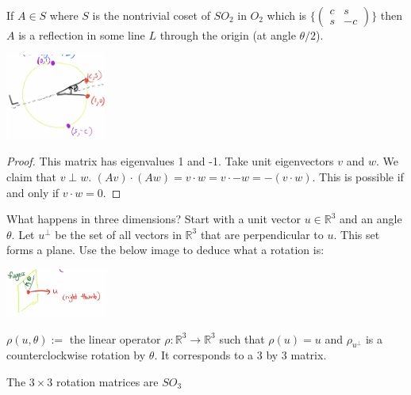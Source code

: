 \documentclass{article}
\newcommand{\R}{\mathbb{R}}
\newcommand{\ra}[1][]{\xrightarrow{#1}}
\begin{document}
\begin{proposition}
If $A\in S$ where $S$ is the nontrivial coset of $SO_2$ in $O_2$ which is $\{\begin{pmatrix}
c&s\\s&-c
\end{pmatrix}\}$ then $A$ is a reflection in some line $L$ through the origin (at angle $\theta/2$). 
    \begin{center}
        \includegraphics[width=0.25\textwidth]{Image 1 9252020.PNG}
    \end{center}
\end{proposition}
\begin{proof}
This matrix has eigenvalues 1 and -1. Take unit eigenvectors $v$ and $w$. We claim that $v\perp w$. $(Av)\cdot (Aw)=v\cdot w=v\cdot -w=-(v\cdot w)$. This is possible if and only if $v\cdot w=0$. 
\end{proof}
What happens in three dimensions? Start with a unit vector $u\in \R^3$ and an angle $\theta$. Let $u^\perp$ be the set of all vectors in $\R^3$ that are perpendicular to $u$. This set forms a plane. Use the below image to deduce what a rotation is:
    \begin{center}
        \includegraphics[width=0.25\textwidth]{Image 2 9252020.PNG}
    \end{center}
$\rho(u,\theta):=$ the linear operator $\rho:\R^3\ra\R^3$ such that $\rho(u)=u$ and $\rho_{u^\perp}$ is a counterclockwise rotation by $\theta$. It corresponds to a 3 by 3 matrix. 
\begin{theorem}
The $3\times 3$ rotation matrices are $SO_3$
\end{theorem}
\end{document}
